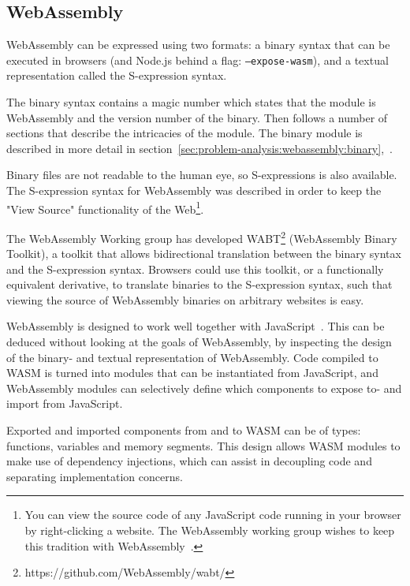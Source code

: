 \documentclass[a4paper]{article}
\begin{document}
\subsection{WebAssembly}
\label{sec:problem-analysis:webassembly}
WebAssembly can be expressed using two formats: a binary syntax that can be executed in browsers (and Node.js behind a flag: \texttt{--expose-wasm}), and a textual representation called the S-expression syntax.

The binary syntax contains a magic number which states that the module is WebAssembly and the version number of the binary. Then follows a number of sections that describe the intricacies of the module. The binary module is described in more detail in section~\ref{sec:problem-analysis:webassembly:binary},~.

Binary files are not readable to the human eye, so S-expressions is also available. The S-expression syntax for WebAssembly was described in order to keep the "View Source" functionality of the Web\footnote{You can view the source code of any JavaScript code running in your browser by right-clicking a website. The WebAssembly working group wishes to keep this tradition with WebAssembly~\cite{website:wasm-webassembly-high-level-goals}.}.

The WebAssembly Working group has developed WABT\footnote{https://github.com/WebAssembly/wabt/} (WebAssembly Binary Toolkit), a toolkit that allows bidirectional translation between the binary syntax and the S-expression syntax. Browsers could use this toolkit, or a functionally equivalent derivative, to translate binaries to the S-expression syntax, such that viewing the source of WebAssembly binaries on arbitrary websites is easy.

WebAssembly is designed to work well together with JavaScript~\cite{website:wasm-webassembly-high-level-goals}. This can be deduced without looking at the goals of WebAssembly, by inspecting the design of the binary- and textual representation of WebAssembly. Code compiled to WASM is turned into modules that can be instantiated from JavaScript, and WebAssembly modules can selectively define which components to expose to- and import from JavaScript.

Exported and imported components from and to WASM can be of types: functions, variables and memory segments. This design allows WASM modules to make use of dependency injections, which can assist in decoupling code and separating implementation concerns.
\end{document}
